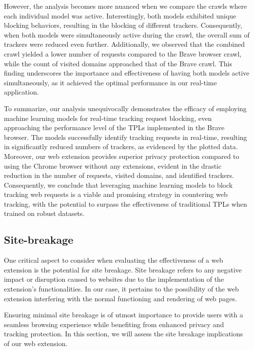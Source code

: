 However, the analysis becomes more nuanced when we compare the crawls where each individual model was active. Interestingly,
both models exhibited unique blocking behaviors, resulting in the blocking of different trackers. Consequently, when both models
were simultaneously active during the crawl, the overall sum of trackers were reduced even further. Additionally, we observed that the
combined crawl yielded a lower number of requests compared to the Brave browser crawl, while the count of visited domains
approached that of the Brave crawl. This finding underscores the importance and effectiveness of having both models active
simultaneously, as it achieved the optimal performance in our real-time application.

To summarize, our analysis unequivocally demonstrates the efficacy of employing machine learning models for real-time tracking
request blocking, even approaching the performance level of the TPLs implemented in the Brave browser. The models successfully
identify tracking requests in real-time, resulting in significantly reduced numbers of trackers, as evidenced by the plotted data.
Moreover, our web extension provides superior privacy protection compared to using the Chrome browser without any extensions, evident
in the drastic reduction in the number of requests, visited domains, and identified trackers. Consequently, we conclude that leveraging
machine learning models to block tracking web requests is a viable and promising strategy in countering web tracking, with the potential
to surpass the effectiveness of traditional TPLs when trained on robust datasets.






\subsection{Site-breakage}
One critical aspect to consider when evaluating the effectiveness of a web extension is the potential for site breakage.
Site breakage refers to any negative impact or disruption caused to websites due to the implementation of the extension's
functionalities. In our case, it pertains to the possibility of the web extension interfering with the normal functioning
and rendering of web pages.

Ensuring minimal site breakage is of utmost importance to provide users with a seamless browsing experience while benefiting
from enhanced privacy and tracking protection. In this section, we will assess the site breakage implications of our web extension.

